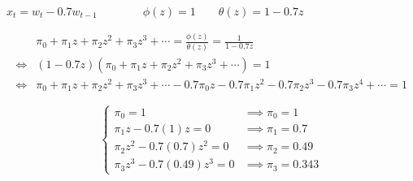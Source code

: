 $x_t = w_t - 0.7w_{t-1} \qquad \qquad \phi(z) = 1 \qquad \theta(z) = 1 - 0.7z$

\begin{align*}
    & \pi_0 + \pi_1 z + \pi_2 z^2 + \pi_3 z^3 + \cdots =\frac{\phi(z)}{\theta(z)} = \frac{1}{1-0.7z}\\
\iff & (1-0.7z)(\pi_0 + \pi_1 z + \pi_2 z^2 + \pi_3 z^3 + \cdots) = 1\\
\iff & \pi_0 + \pi_1 z + \pi_2 z^2 + \pi_3 z^3 + \cdots -0.7 \pi_0z - 0.7 \pi_1 z^2 -0.7 \pi_2 z^3 - 0.7 \pi_3 z^4 + \cdots = 1
\end{align*}

$$\begin{cases}
    \pi_0 = 1 & \implies \pi_0 = 1\\
    \pi_1z -0.7 (1) z = 0 & \implies \pi_1 = 0.7\\
    \pi_2 z^2 - 0.7 (0.7)z^2 = 0 & \implies \pi_2 = 0.49\\
    \pi_3 z^3 - 0.7 (0.49)z^3 = 0 & \implies \pi_3 = 0.343
\end{cases}$$
